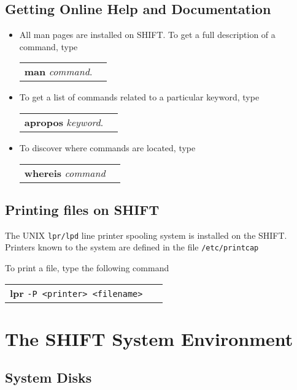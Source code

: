 \section{Getting Online Help and Documentation}
 
\begin{itemize}
\item
All man pages are installed on SHIFT. To get a full description of a
command, type
\begin{center}
\begin{tabular}{ll}
{\bf man} {\it command}.
\end{tabular}
\end{center}
\item
To get a list of commands related to a particular keyword, type
\begin{center}
\begin{tabular}{ll}
{\bf apropos} {\it keyword}.
\end{tabular}
\end{center}
\item
To discover where commands are located, type
\begin{center}
\begin{tabular}{ll}
{\bf whereis} {\it command}
\end{tabular}
\end{center}
\end{itemize}
 
\section {Printing files on SHIFT}
 
The UNIX {\tt lpr/lpd} line printer spooling system is installed
on the SHIFT. Printers known to the system are
defined in the file {\tt /etc/printcap}
 
To print a file, type the following command
 
\begin{center}
\begin{tabular}{ll}
{\bf lpr} {\tt -P <printer>  <filename> }
\end{tabular}
\end{center}
 
 
\chapter{The SHIFT System Environment}
 
\section{\bf System Disks}
 
